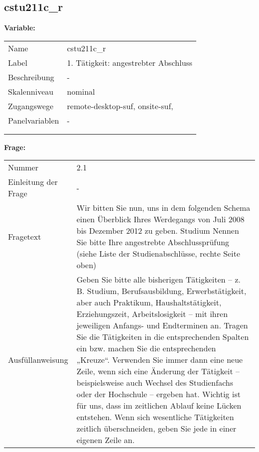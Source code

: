 	
	
	\subsection{cstu211c\_r}
	\label{subSection:cstu211c_r}

	\noindent\textbf{Variable:}\\
		\begin{tabular}{lL{11.3cm}}
			\label{tableVariable:cstu211c_r}
			Name & cstu211c\_r \\
			Label & 1. Tätigkeit: angestrebter Abschluss \\
			Beschreibung & - \\
			Skalenniveau & nominal \\
			Zugangswege &
				remote-desktop-suf,
				onsite-suf,
 \\
			Panelvariablen & -
			 \\
			 \\
 \\
		\end{tabular}

		\vspace*{1 cm}
		\noindent\textbf{Frage:}\\
		\begin{tabular}{lL{11.3cm}}
			\label{tableQuestion:cstu211c_r}
			Nummer & 2.1 \\
			Einleitung der Frage & - \\
			Fragetext & Wir bitten Sie nun, uns in dem folgenden Schema einen Überblick Ihres Werdegangs von Juli 2008 bis Dezember 2012 zu geben.
Studium
Nennen Sie bitte Ihre angestrebte Abschlussprüfung 
(siehe Liste der Studienabschlüsse, rechte Seite oben) \\
			Ausfüllanweisung & Geben Sie bitte alle bisherigen Tätigkeiten – z. B. Studium, Berufsausbildung, Erwerbstätigkeit, aber auch Praktikum, Haushaltstätigkeit,
Erziehungszeit, Arbeitslosigkeit – mit ihren jeweiligen Anfangs- und Endterminen an. Tragen Sie die Tätigkeiten in die entsprechenden Spalten ein bzw. machen Sie die entsprechenden „Kreuze“. Verwenden Sie immer dann eine neue Zeile, wenn sich eine Änderung der Tätigkeit – beispielsweise auch Wechsel des Studienfachs oder der Hochschule – ergeben hat. Wichtig ist für uns, dass im zeitlichen Ablauf keine Lücken entstehen. Wenn sich wesentliche Tätigkeiten zeitlich überschneiden, geben Sie jede in einer eigenen Zeile an. \\
		\end{tabular}





